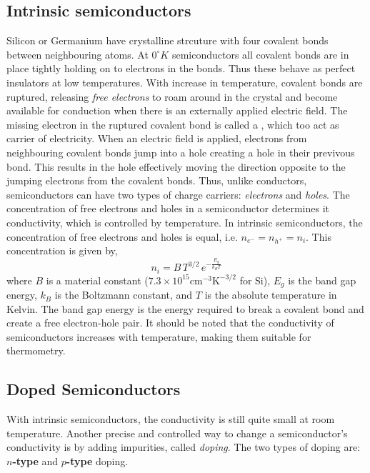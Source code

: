 \subsection{Intrinsic semiconductors}
Silicon or Germanium have crystalline strcuture with four covalent bonds between neighbouring atoms. At $0^\circ K$ semiconductors all covalent bonds are in place tightly holding on to electrons in the bonds. Thus these behave as perfect insulators at low temperatures. With increase in temperature, covalent bonds are ruptured, releasing \textit{free electrons} to roam around in the crystal and become available for conduction when there is an externally applied electric field. The missing electron in the ruptured covalent bond is called a , which too act as carrier of electricity. When an electric field is applied, electrons from neighbouring covalent bonds jump into a hole creating a hole in their previvous bond. This results in the hole effectively moving the direction opposite to the jumping electrons from the covalent bonds. Thus, unlike conductors, semiconductors can have two types of charge carriers: \textit{electrons} and \textit{holes}. The concentration of free electrons and holes in a semiconductor determines it conductivity, which is controlled by temperature. In intrinsic semiconductors, the concentration of free electrons and holes is equal, i.e. $n_{e^-} = n_{h^+} = n_i$. This concentration is given by,
\begin{equation}
    n_i = B \, T^{3/2} \, e^{-\frac{E_g}{k_B T}}
    \label{eq:ch03-intrinsic-elec-conc}
\end{equation}
where $B$ is a material constant ($7.3 \times 10^15 \text{cm}^{-3}\text{K}^{-3/2}$ for Si), $E_g$ is the band gap energy, $k_B$ is the Boltzmann constant, and $T$ is the absolute temperature in Kelvin. The band gap energy is the energy required to break a covalent bond and create a free electron-hole pair. It should be noted that the conductivity of semiconductors increases with temperature, making them suitable for thermometry.

\subsection{Doped Semiconductors}
With intrinsic semiconductors, the conductivity is still quite small at room temperature. Another precise and controlled way to change a semiconductor's conductivity is by adding impurities, called \textit{doping}. The two types of doping are: \textbf{$n$-type} and \textbf{$p$-type} doping. 

